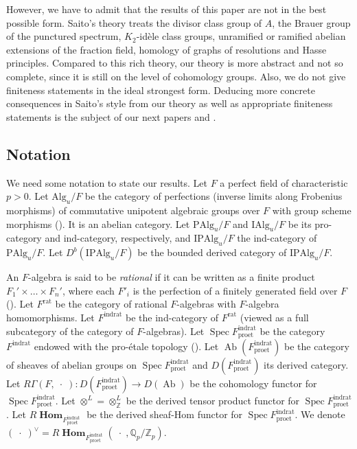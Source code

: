 \documentclass{amsart}
\theoremstyle{remark}
\numberwithin{equation}{subsection}
\newcommand{\tensor}{\mathbin{\otimes}}
\newcommand{\Z}{\mathbb{Z}}
\newcommand{\Q}{\mathbb{Q}}
\newcommand{\et}{\mathrm{et}}
\newcommand{\rat}{\mathrm{rat}}
\newcommand{\ind}{\mathrm{ind}}
\newcommand{\pro}{\mathrm{pro}}
\newcommand{\Alg}{\mathrm{Alg}}
\newcommand{\Ind}{\mathrm{I}}
\newcommand{\Pro}{\mathrm{P}}
\newcommand{\alg}[1]{\mathbf{#1}}
\newcommand{\var}{\;\cdot\;}
\DeclareMathOperator{\Spec}{Spec}
\DeclareMathOperator{\Ab}{Ab}
\DeclareMathOperator{\sheafhom}{\alg{Hom}}
\begin{document}
However, we have to admit that the results of this paper are not in the best possible form.
Saito's theory treats the divisor class group of $A$,
the Brauer group of the punctured spectrum,
$K_{2}$-id\`ele class groups, unramified or ramified abelian extensions of the fraction field,
homology of graphs of resolutions and Hasse principles.
Compared to this rich theory, our theory is more abstract and not so complete,
since it is still on the level of cohomology groups.
Also, we do not give finiteness statements in the ideal strongest form.
Deducing more concrete consequences in Saito's style from our theory
as well as appropriate finiteness statements
is the subject of our next papers \cite{Suz22Nilp} and \cite{Suz22CFT}.


\subsection{Notation}
\label{0126}

We need some notation to state our results.
Let $F$ a perfect field of characteristic $p > 0$.
Let $\Alg_{u} / F$ be the category of perfections (inverse limits along Frobenius morphisms)
of commutative unipotent algebraic groups over $F$
with group scheme morphisms (\cite{Ser60}).
It is an abelian category.
Let $\Pro \Alg_{u} / F$ and $\Ind \Alg_{u} / F$ be its pro-category and ind-category, respectively,
and $\Ind \Pro \Alg_{u} / F$ the ind-category of $\Pro \Alg_{u} / F$.
Let $D^{b}(\Ind \Pro \Alg_{u} / F)$ be the bounded derived category of $\Ind \Pro \Alg_{u} / F$.

An $F$-algebra is said to be \emph{rational} if
it can be written as a finite product $F_{1}' \times \dots \times F_{n}'$,
where each $F'_{i}$ is the perfection of a finitely generated field over $F$ (\cite{Suz22Duality}).
Let $F^{\rat}$ be the category of rational $F$-algebras
with $F$-algebra homomorphisms.
Let $F^{\ind\rat}$ be the ind-category of $F^{\rat}$
(viewed as a full subcategory of the category of $F$-algebras).
Let $\Spec F^{\ind\rat}_{\pro\et}$ be the category $F^{\ind\rat}$
endowed with the pro-\'etale topology (\cite{Suz20}).
Let $\Ab(F^{\ind\rat}_{\pro\et})$ be the category of sheaves
of abelian groups on $\Spec F^{\ind\rat}_{\pro\et}$
and $D(F^{\ind\rat}_{\pro\et})$ its derived category.
Let $R \Gamma(F, \var) \colon D(F^{\ind\rat}_{\pro\et}) \to D(\Ab)$
be the cohomology functor for $\Spec F^{\ind\rat}_{\pro\et}$.
Let $\tensor^{L} = \tensor_{\Z}^{L}$ be the derived tensor product functor
for $\Spec F^{\ind\rat}_{\pro\et}$.
Let $R \sheafhom_{F^{\ind\rat}_{\pro\et}}$ be the derived sheaf-Hom functor
for $\Spec F^{\ind\rat}_{\pro\et}$.
We denote $(\var)^{\vee} = R \sheafhom_{F^{\ind\rat}_{\pro\et}}(\var, \Q_{p} / \Z_{p})$.
\end{document}
